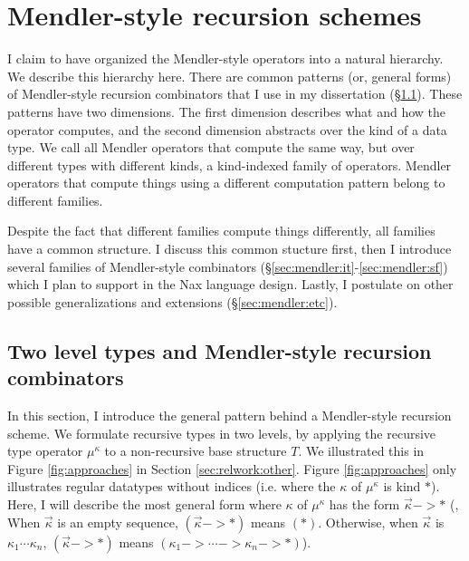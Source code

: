 \section{Mendler-style recursion schemes}\label{sec:mendler} I claim to
have organized the Mendler-style operators into a natural hierarchy. We
describe this hierarchy here. There are common patterns (or, general
forms) of Mendler-style recursion combinators that I use in my
dissertation (\S\ref{sec:mendler:intro}). These patterns have two
dimensions. The first dimension describes what and how the operator
computes, and the second dimension abstracts over the kind of a data
type. We call all Mendler operators that compute the same way, but over
different types with different kinds,  a kind-indexed family of
operators. Mendler operators that compute things using a different
computation pattern belong to different families.

Despite the fact that different families compute things differently, all
families have a common structure. I discuss this common stucture first,
then I introduce several families of Mendler-style combinators
(\S\ref{sec:mendler:it}-\ref{sec:mendler:sf}) which I plan to support in
the Nax language design. Lastly, I postulate on other possible
generalizations and extensions (\S\ref{sec:mendler:etc}).

\subsection{Two level types and Mendler-style recursion combinators}
\label{sec:mendler:intro}
In this section, I introduce the general pattern behind a Mendler-style recursion scheme.
We formulate recursive types in two levels,  by applying the recursive type operator
$\mu^\kappa$ to a non-recursive base structure $T$. 
We illustrated this in Figure \ref{fig:approaches}
in Section \ref{sec:relwork:other}. Figure \ref{fig:approaches}
only illustrates regular datatypes without indices
(i.e. where the $\kappa$ of $\mu^\kappa$ is kind $*$). Here, I will describe
the most general form where $\kappa$ of $\mu^\kappa$ has the form
$\vec{\kappa} -> *$ (\ie, When $\vec{\kappa}$ is an empty sequence,
$(\vec{\kappa} -> *)$ means $(*)$. Otherwise, when $\vec{\kappa}$ is
$\kappa_1 \cdots \kappa_n$, $(\vec{\kappa} -> *)$ means
$(\kappa_1 -> \cdots -> \kappa_n -> *)$).

